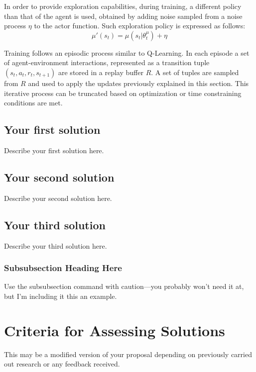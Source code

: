 \documentclass[peerreview]{IEEEtran}
\begin{document}
 In order to provide exploration capabilities, during training, a different policy than that of the agent is used, obtained by adding noise sampled from a noise process $\eta$ to the actor function. Such exploration policy is expressed as follows: 
 \begin{equation}
 	\mu'(s_t)=\mu(s_t|\theta_t^\mu ) + \eta
 \end{equation}
 
Training follows an episodic process similar to Q-Learning. In each episode a set of agent-environment interactions, represented as a transition tuple $(s_t, a_t, r_t, s_{t+1})$ are stored in a replay buffer $R$. A set of tuples are sampled from $R$ and used to apply the updates previously explained in this section. This iterative process can be truncated based on optimization or time constraining conditions are met.

 
   
\subsection{Your first solution}
Describe your first solution here.
\subsection{Your second solution}
Describe your second solution here.
\subsection{Your third solution}
Describe your third solution here.
\subsubsection{Subsubsection Heading Here}
Use the subsubsection command with caution---you probably won't need it at, but I'm including it this an example.

\section{Criteria for Assessing Solutions} \label{sec:criteria}
This may be a modified version of your proposal depending on previously carried out research or any feedback received.  
\end{document}
